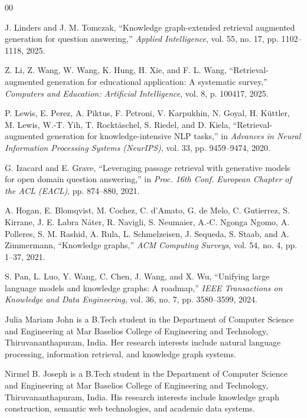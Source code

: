 \documentclass{ieeeaccess}
\begin{document}
\begin{thebibliography}{00}

J. Linders and J. M. Tomczak, ``Knowledge graph-extended retrieval augmented generation for question answering,'' \emph{Applied Intelligence}, vol. 55, no. 17, pp. 1102--1118, 2025.

Z. Li, Z. Wang, W. Wang, K. Hung, H. Xie, and F. L. Wang, ``Retrieval-augmented generation for educational application: A systematic survey,'' \emph{Computers and Education: Artificial Intelligence}, vol. 8, p. 100417, 2025.

P. Lewis, E. Perez, A. Piktus, F. Petroni, V. Karpukhin, N. Goyal, H. K\"{u}ttler, M. Lewis, W.-T. Yih, T. Rockt\"{a}schel, S. Riedel, and D. Kiela, ``Retrieval-augmented generation for knowledge-intensive NLP tasks,'' in \emph{Advances in Neural Information Processing Systems (NeurIPS)}, vol. 33, pp. 9459--9474, 2020.

G. Izacard and E. Grave, ``Leveraging passage retrieval with generative models for open domain question answering,'' in \emph{Proc. 16th Conf. European Chapter of the ACL (EACL)}, pp. 874--880, 2021.

A. Hogan, E. Blomqvist, M. Cochez, C. d'Amato, G. de Melo, C. Gutierrez, S. Kirrane, J. E. Labra N\'{a}ter, R. Navigli, S. Neumaier, A.-C. Ngonga Ngomo, A. Polleres, S. M. Rashid, A. Rula, L. Schmelzeisen, J. Sequeda, S. Staab, and A. Zimmermann, ``Knowledge graphs,'' \emph{ACM Computing Surveys}, vol. 54, no. 4, pp. 1--37, 2021.

S. Pan, L. Luo, Y. Wang, C. Chen, J. Wang, and X. Wu, ``Unifying large language models and knowledge graphs: A roadmap,'' \emph{IEEE Transactions on Knowledge and Data Engineering}, vol. 36, no. 7, pp. 3580--3599, 2024.

\end{thebibliography}

\begin{IEEEbiographynophoto}{Julia Mariam John}
is a B.Tech student in the Department of Computer Science and Engineering at Mar Baselios College of Engineering and Technology, Thiruvananthapuram, India. Her research interests include natural language processing, information retrieval, and knowledge graph systems.
\end{IEEEbiographynophoto}

\begin{IEEEbiographynophoto}{Nirmel B. Joseph}
is a B.Tech student in the Department of Computer Science and Engineering at Mar Baselios College of Engineering and Technology, Thiruvananthapuram, India. His research interests include knowledge graph construction, semantic web technologies, and academic data systems.
\end{IEEEbiographynophoto}
\end{document}
